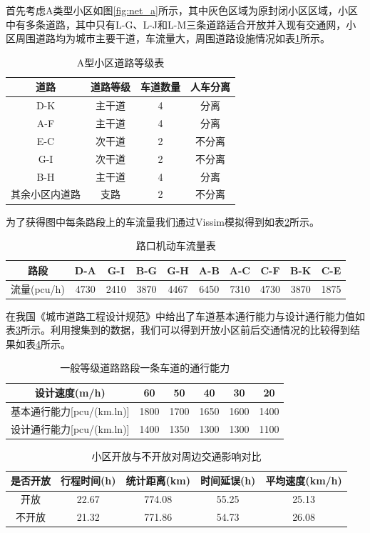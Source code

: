\documentclass[fontset=windows,a4paper,12pt]{ctexart}
\begin{document}
		首先考虑A类型小区如图\ref{fig:net_a}所示，其中灰色区域为原封闭小区区域，小区中有多条道路，其中只有L-G、L-J和L-M三条道路适合开放并入现有交通网，小区周围道路均为城市主要干道，车流量大，周围道路设施情况如表\ref{tab:road_level_a}所示。
		

		\begin{table}[!htbp]
			\centering
			\caption{A型小区道路等级表}
			\label{tab:road_level_a}
			\begin{tabular}{c|ccc}
				\toprule[1pt] 
				道路&				道路等级&	车道数量&人车分离\\
				\hline
				D-K&				主干道&	4&		分离\\
				A-F&				主干道&	4&		分离\\
				E-C&				次干道&	2&		不分离\\
				G-I&				次干道&	2&		不分离\\
				B-H&				主干道&	4&		分离\\
				其余小区内道路	&		支路&		2&		不分离\\
				\bottomrule[1pt]
			\end{tabular} 
		\end{table}
		为了获得图中每条路段上的车流量我们通过Vissim模拟得到如表\ref{tab:car_flow_a}所示。
		\begin{table}[!htbp]
			\centering
			\caption{路口机动车流量表}
			\label{tab:car_flow_a}
			\begin{tabular}{c|ccccccccc}
				\toprule[1pt] 
				路段&	D-A&	G-I&	B-G&	G-H&	A-B&	A-C&	C-F&	B-K&	C-E\\
				\hline
				流量(pcu/h)&	4730&	2410&	3870&	4467&	6450&	7310&	4730&	3870&	1875\\
				\bottomrule[1pt]
			\end{tabular} 
		\end{table}
		在我国《城市道路工程设计规范》中给出了车道基本通行能力与设计通行能力值如表\ref{tab:road_flow}所示。利用搜集到的数据，我们可以得到开放小区前后交通情况的比较得到结果如表\ref{tab:cmp_each}所示。
		\begin{table}[!htbp]
			\centering
			\caption{一般等级道路路段一条车道的通行能力}
			\label{tab:road_flow}
			\begin{tabular}{c|ccccc}
				\toprule[1pt] 
				设计速度(m/h)&	60&	50&	40&	30&	20\\
				\hline
				基本通行能力[pcu/(km.ln)]& 1800& 1700& 1650& 1600& 1400\\
				设计通行能力[pcu/(km.ln)]& 1400& 1350& 1300& 1300& 1100\\
				\bottomrule[1pt]
			\end{tabular} 
		\end{table}	
		\begin{table}[!htbp]
			\centering
			\caption{小区开放与不开放对周边交通影响对比}
			\label{tab:cmp_each}
			\begin{tabular}{c|cccc}
				\toprule[1pt] 
				是否开放&	行程时间(h)&	统计距离(km)&	时间延误(h)&	平均速度(km/h)\\
				\hline
				开放& 22.67& 774.08& 55.25& 25.13\\
				不开放& 21.32& 771.86& 54.73& 26.08\\
				\bottomrule[1pt]
			\end{tabular} 
		\end{table}			
\end{document}
